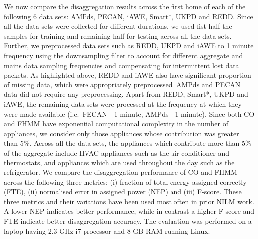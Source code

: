 \documentclass{sig-alternate}
\newcommand{\redcolor}[1]{\textcolor{red}{#1}}
\newcommand{\tabref}[1]{Table~\ref{#1}}
\begin{document}
\noindent
We now compare the disaggregation results across the first home of each of the following 6 data sets: AMPds, PECAN, iAWE, Smart*, UKPD and REDD. Since all the data sets were collected for different durations, we used fist half the samples for training and remaining half for testing across all the data sets. Further, we preprocessed data sets such as REDD, UKPD and iAWE to 1 minute frequency using the downsampling filter to account for different aggregate and mains data sampling frequencies and compensating for intermittent lost data packets. 
As highlighted above, REDD and iAWE also have significant proportion of missing data, which were appropriately preprocessed. AMPds and PECAN data did not require any preprocessing. Apart from REDD, Smart*, UKPD and iAWE, the remaining data sets were processed at the frequency at which they were made available (i.e.\ PECAN - 1 minute, AMPds - 1 minute). Since both CO and FHMM have exponential computational complexity in the number of appliances, we consider only those appliances whose contribution was greater than 5\%. Across all the data sets, the appliances which contribute more than 5\% of the aggregate include HVAC appliances such as the air conditioner and thermostats, and appliances which are used throughout the day such as the refrigerator. We compare the disaggregation performance of CO and FHMM across the following three metrics: (i) fraction of total energy assigned correctly (FTE), (ii) normalised error in assigned power (NEP) and (iii) F-score. These three metrics and their variations have been used most often in prior NILM work. %
A lower NEP indicates better performance, while in contrast a higher F-score and FTE indicate better disaggregation accuracy. The evaluation was performed on a laptop having 2.3 GHz i7 processor and 8 GB RAM running Linux.

\end{document}
